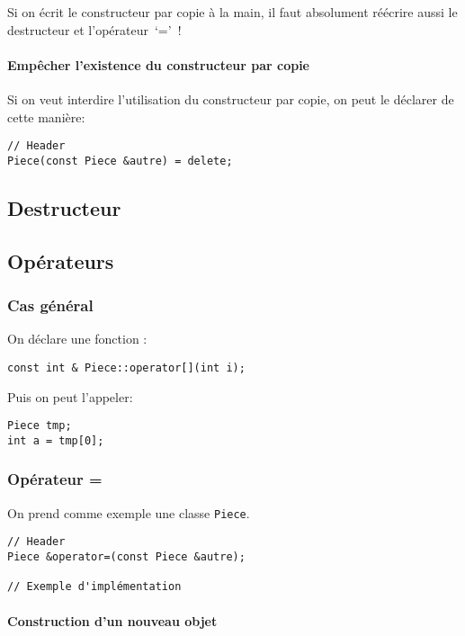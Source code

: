 \documentclass[10pt,a4paper,french]{article}
\begin{document}
Si on écrit le constructeur par copie à la main, il faut absolument réécrire aussi le destructeur et l'opérateur~`='~!

\paragraph{Empêcher l'existence du constructeur par copie}

Si on veut interdire l'utilisation du constructeur par copie, on peut le déclarer de cette manière:

\begin{verbatim}
// Header
Piece(const Piece &autre) = delete;
\end{verbatim}

\subsection{Destructeur}

\subsection{Opérateurs}

\subsubsection{Cas général}

On déclare une fonction :

\begin{verbatim}
const int & Piece::operator[](int i);
\end{verbatim}

Puis on peut l'appeler:

\begin{verbatim}
Piece tmp;
int a = tmp[0];
\end{verbatim}

\subsubsection{Opérateur =}

On prend comme exemple une classe {\tt Piece}.

\begin{verbatim}
// Header
Piece &operator=(const Piece &autre);

// Exemple d'implémentation

\end{verbatim}

\paragraph{Construction d'un nouveau objet}
\end{document}
